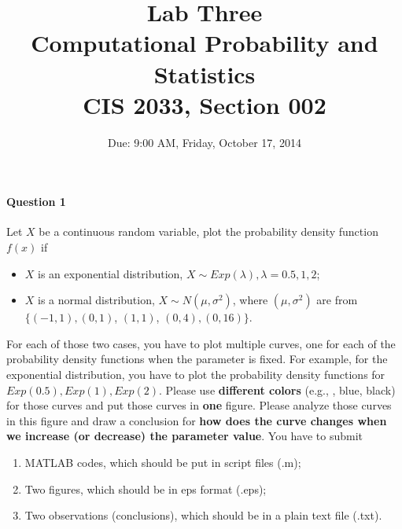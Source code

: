 \documentclass[11pt]{article} %
\title{Lab Three\\
Computational Probability and Statistics \\
CIS 2033, Section 002}
\author{Due: 9:00 AM, Friday, October 17, 2014}
\date{} %
\begin{document}
\maketitle

\paragraph*{Question 1}
Let $X$ be a continuous random variable, plot the probability density function $f(x)$ if
\begin{itemize}
\item $X$ is an exponential distribution, $X \sim Exp(\lambda), \lambda = 0.5, 1, 2$;
\item $X$ is a normal distribution, $X \sim N(\mu, \sigma^2)$, where $(\mu, \sigma^2)$ are from $\{(-1, 1), (0, 1)$, $(1, 1)$, $(0, 4), (0, 16)\}$.
\end{itemize}
For each of those two cases, you have to plot multiple curves, one for each of the probability density functions when the parameter is fixed. For example, for the exponential distribution, you have to plot the probability density functions for $Exp(0.5), Exp(1), Exp(2)$. Please use {\bf different colors} (e.g., {\color{red}{red}}, {\color{blue}blue}, {\color{black}black}) for those curves and put those curves in {\bf one} figure. Please analyze those curves in this figure and draw a conclusion for {\bf how does the curve changes when we increase (or decrease) the parameter value}. 
You have to submit 
\begin{enumerate}
\item MATLAB codes, which should be put in script files (.m); 
\item Two figures, which should be in eps format (.eps);
\item Two observations (conclusions), which should be in a plain text file (.txt). 
\end{enumerate}
\end{document}
